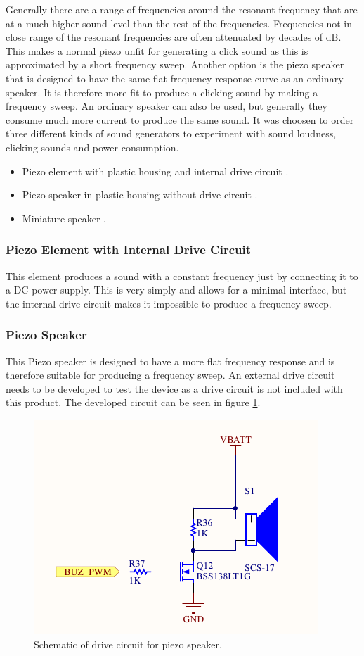 Generally there are a range of frequencies around the resonant frequency that are at a much higher sound level than the rest of the frequencies.
Frequencies not in close range of the resonant frequencies are often attenuated by decades of dB.
This makes a normal piezo unfit for generating a click sound as this is approximated by a short frequency sweep.
Another option is the piezo speaker that is designed to have the same flat frequency response curve as an ordinary speaker.
It is therefore more fit to produce a clicking sound by making a frequency sweep.
An ordinary speaker can also be used, but generally they consume much more current to produce the same sound.
It was choosen to order three different kinds of sound generators to experiment with sound loudness, clicking sounds and power consumption.
\begin{itemize}
  \item Piezo element with plastic housing and internal drive circuit \cite{piezo1}.
        
  \item Piezo speaker in plastic housing without drive circuit \cite{piezo2}.
        
  \item Miniature speaker \cite{piezo3}.
          
\end{itemize}
\subsubsection*{Piezo Element with Internal Drive Circuit}
This element produces a sound with a constant frequency just by connecting it to a DC power supply. 
This is very simply and allows for a minimal interface, but the internal drive circuit makes it impossible to produce a frequency sweep. 

\subsubsection*{Piezo Speaker}
This Piezo speaker is designed to have a more flat frequency response and is therefore suitable for producing a frequency sweep. 
An external drive circuit needs to be developed to test the device as a drive circuit is not included with this product.
The developed circuit can be seen in figure \ref{fig:buzzer_circuit}.

\begin{figure}[h]
	\centering
	\includegraphics[width=.6\linewidth]{graphics/buzzer_circuit.pdf}
	\caption{Schematic of drive circuit for piezo speaker.}
	\label{fig:buzzer_circuit}
\end{figure}

